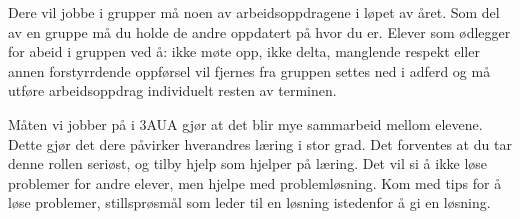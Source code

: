 \noindent
{} Dere vil jobbe i grupper må noen av arbeidsoppdragene i løpet av året. Som del av en gruppe må du holde de andre oppdatert på hvor du er. Elever som ødlegger for abeid i gruppen  ved å: ikke møte opp, ikke delta, manglende respekt eller annen forstyrrdende oppførsel vil fjernes fra gruppen settes ned i adferd og må utføre arbeidsoppdrag individuelt resten av terminen. 
\vskip 10pt

\noindent
{} Måten vi jobber på i 3AUA gjør at det blir mye sammarbeid mellom elevene. Dette gjør det dere påvirker hverandres læring i stor grad. Det forventes at du tar denne rollen seriøst, og tilby hjelp som hjelper på læring. Det vil si å ikke løse problemer for andre elever, men hjelpe med problemløsning. Kom med tips for å løse problemer, stillsprøsmål som leder til en løsning istedenfor å gi en løsning. 
\vskip 10pt



%

